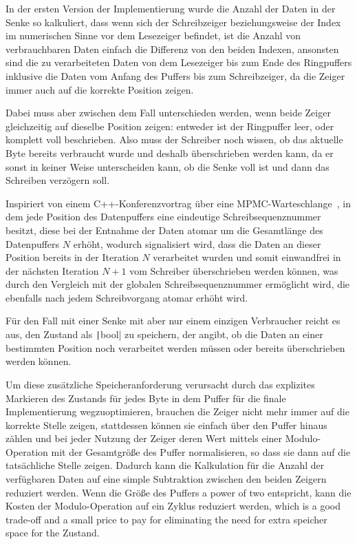 In der ersten Version der Implementierung wurde die Anzahl der Daten in der
Senke so kalkuliert, dass wenn sich der Schreibzeiger beziehungsweise der Index
im numerischen Sinne vor dem Lesezeiger befindet, ist die Anzahl von
verbrauchbaren Daten einfach die Differenz von den beiden Indexen, ansonsten
sind die zu verarbeiteten Daten von dem Lesezeiger bis zum Ende des Ringpuffers
inklusive die Daten vom Anfang des Puffers bis zum Schreibzeiger, da die Zeiger
immer auch auf die korrekte Position zeigen.

Dabei muss aber zwischen dem Fall unterschieden werden, wenn beide Zeiger
gleichzeitig auf dieselbe Position zeigen: entweder ist der Ringpuffer leer,
oder komplett voll beschrieben. Also muss der Schreiber noch wissen, ob das
aktuelle Byte bereits verbraucht wurde und deshalb überschrieben werden kann, da
er sonst in keiner Weise unterscheiden kann, ob die Senke voll ist und dann das
Schreiben verzögern soll.

Inspiriert von einem C++-Konferenzvortrag über eine
\ac{MPMC}-Warteschlange~\cite{CppCon2024LockFreeQueue}, in dem jede Position des
Datenpuffers eine eindeutige Schreibsequenznummer besitzt, diese bei der
Entnahme der Daten atomar um die Gesamtlänge des Datenpuffers $N$ erhöht,
wodurch signalisiert wird, dass die Daten an dieser Position bereits in der
Iteration $N$ verarbeitet wurden und somit einwandfrei in der nächsten Iteration
$N + 1$ vom Schreiber überschrieben werden können, was durch den Vergleich mit
der globalen Schreibsequenznummer ermöglicht wird, die ebenfalls nach jedem
Schreibvorgang atomar erhöht wird.

Für den Fall mit einer Senke mit aber nur einem einzigen Verbraucher reicht es
aus, den Zustand als \texttt|bool| zu speichern, der angibt, ob die
Daten an einer bestimmten Position noch verarbeitet werden müssen oder bereits
überschrieben werden können.

Um diese zusätzliche Speicheranforderung verursacht durch das explizites
Markieren des Zustands für jedes Byte in dem Puffer für die finale
Implementierung wegzuoptimieren, brauchen die Zeiger nicht mehr immer auf die
korrekte Stelle zeigen, stattdessen können sie einfach über den Puffer hinaus
zählen und bei jeder Nutzung der Zeiger deren Wert mittels einer
Modulo-Operation mit der Gesamtgröße des Puffer normalisieren, so dass sie dann
auf die tatsächliche Stelle zeigen. Dadurch kann die Kalkulation für die Anzahl
der verfügbaren Daten auf eine simple Subtraktion zwischen den beiden Zeigern
reduziert werden. Wenn die Größe des Puffers a power of two entspricht, kann die
Kosten der Modulo-Operation auf ein Zyklus reduziert werden, which is a good
trade-off and a small price to pay for eliminating the need for extra speicher
space for the Zustand.

